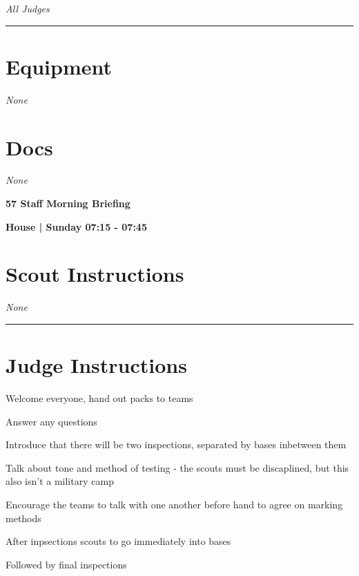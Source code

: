 \documentclass[10pt]{article}
\newcommand{\newtitle}[1]{\begin{center}{\Huge\bfseries #1 }\\ \vspace{5mm}\end{center}}
\newcommand{\newsubtitle}[1]{\begin{center}{\color{grey}\Large\bfseries #1 }\\ \vspace{5mm}\end{center}}
\begin{document}
					\textit{All Judges}
			\vspace{0.5cm}
	\hrule
	\vspace{0.5cm}

	\begin{multicols}{2}

		\section*{\faWrench \: Equipment}

				\textit{None}
		
		\vfill\null
		\columnbreak

			\section*{\faFile \: Docs}
		 	\textit{None}
	

		\vfill\null

		\end{multicols}



	\vspace{1cm}


	\clearpage
		\newtitle{57 Staff Morning Briefing }
	\newsubtitle{House | Sunday 07:15 - 07:45}
		\setcounter{section}{56}
	\section*{Scout Instructions}
		\textit{None}
	
	\vspace{0.5cm}
	\hrule
	\vspace{0.5cm}

		\section*{Judge Instructions}
		Welcome everyone, hand out packs to teams

Answer any questions

Introduce that there will be two inspections, separated by bases inbetween them

Talk about tone and method of testing - the scouts must be discaplined, but this also isn't a military camp

Encourage the teams to talk with one another before hand to agree on marking methods

After inpsections scouts to go immediately into bases

Followed by final inspections
\end{document}
